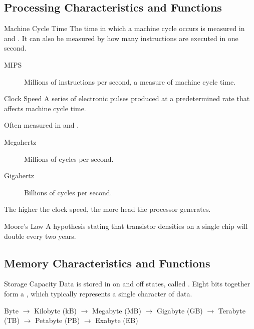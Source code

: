 \documentclass[\main/notes.tex]{subfiles}
\begin{document}
			\subsection{Processing Characteristics and Functions}
				\begin{definition}{Machine Cycle Time}
					The time in which a machine cycle occurs is measured in  and . It can also be measured by how many instructions are executed in one second.
					\begin{description}
						\item[MIPS] Millions of instructions per second, a measure of machine cycle time. 
					\end{description}
				\end{definition}
				\begin{definition}{Clock Speed}
					A series of electronic pulses produced at a predetermined rate that affects machine cycle time.

					Often measured in  and .
					\begin{description}
						\item[Megahertz] Millions of cycles per second.
						\item[Gigahertz] Billions of cycles per second.
					\end{description}

					The higher the clock speed, the more head the processor generates.
				\end{definition}
				\begin{sidenote}{Moore's Law}
					A hypothesis stating that transistor densities on a single chip will double every two years.
				\end{sidenote}
			\subsection{Memory Characteristics and Functions}
				\begin{definition}{Storage Capacity}
					Data is stored in on and off states, called . Eight bits together form a , which typically represents a single character of data.

					\begin{center}
					Byte $\rightarrow$ Kilobyte (kB) $\rightarrow$ Megabyte (MB) $\rightarrow$ Gigabyte (GB) $\rightarrow$ Terabyte (TB) $\rightarrow$ Petabyte (PB) $\rightarrow$ Exabyte (EB)
					\end{center}
				\end{definition}
\end{document}
